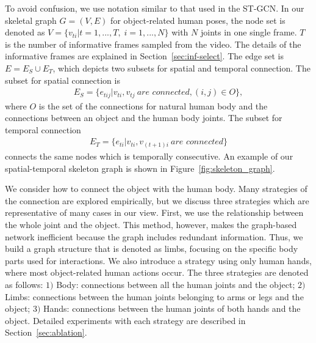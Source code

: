 \documentclass[10pt,twocolumn,letterpaper]{article}
\begin{document}
To avoid confusion, we use notation similar to that used in the ST-GCN.
In our skeletal graph $G=(V,E)$ for object-related human poses, the node set is denoted as $V=\{v_{ti}|t=1,...,T,\; i=1,...,N\}$ with $N$ joints in one single frame. 
$T$ is the number of informative frames sampled from the video.
The details of the informative frames are explained in Section~\ref{sec:inf-select}.
The edge set is $E=E_S\cup E_T$, which depicts two subsets for spatial and temporal connection.
The subset for spatial connection is 
\begin{equation}
\begin{aligned}
\label{eq:graph_const}
  E_S=\{e_{tij}|v_{ti},v_{tj}~\textit{are connected}, (i,j)\in O\},
\end{aligned}
\end{equation}
where $O$ is the set of the connections for natural human body and the connections between an object and the human body joints.
The subset for temporal connection
\begin{equation}
\begin{aligned}
\label{eq:graph_const2}
    E_T=\{e_{ti}|v_{ti},v_{(t+1)i}~\textit{are connected}\}
\end{aligned}
\end{equation}
connects the same nodes which is temporally consecutive.
An example of our spatial-temporal skeleton graph is shown in Figure~\ref{fig:skeleton_graph}.

We consider how to connect the object with the human body.
Many strategies of the connection are explored empirically, but we discuss three strategies which are representative of many cases in our view.
First, we use the relationship between the whole joint and the object.
This method, however, makes the graph-based network inefficient because the graph includes redundant information.
Thus, we build a graph structure that is denoted as limbs, focusing on the specific body parts used for interactions. 
We also introduce a strategy using only human hands, where most object-related human actions occur.
The three strategies are denoted as follows: 
$1)$ Body: connections between all the human joints and the object; 
$2)$ Limbs: connections between the human joints belonging to arms or legs and the object; 
$3)$ Hands: connections between the human joints of both hands and the object.
Detailed experiments with each strategy are described in Section~\ref{sec:ablation}.
\end{document}
